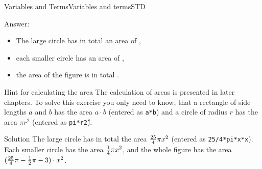 \begin{MXContent}{Variables and Terms}{Variables and terms}{STD}
\begin{MExercise}
Answer:
\begin{itemize}
\item{The large circle has in total an area of ,}
\item{each smaller circle has an area of ,}
\item{the area of the figure is in total .}
\end{itemize}

\begin{MHint}{Hint for calculating the area}
The calculation of areas is presented in later chapters. To solve this exercise you only need to know, that
a rectangle of side lengths $a$ and $b$ has the area $a\cdot b$ (entered as \texttt{a*b}) and  
a circle of radius $r$ has the area $\pi r^2$ (entered as \texttt{pi*r\^2}).
\end{MHint}

\begin{MHint}{Solution}
The large circle has in total the area $\tfrac{25}{4}\pi x^2$ (entered as \texttt{25/4*pi*x*x}).
Each smaller circle has the area $\tfrac{1}{4}\pi x^2$, and the whole figure has the area 
$(\tfrac{25}{4}\pi-\tfrac{1}{2}\pi-3)\cdot x^2$.
\end{MHint}
\end{MExercise}

\end{MXContent}

